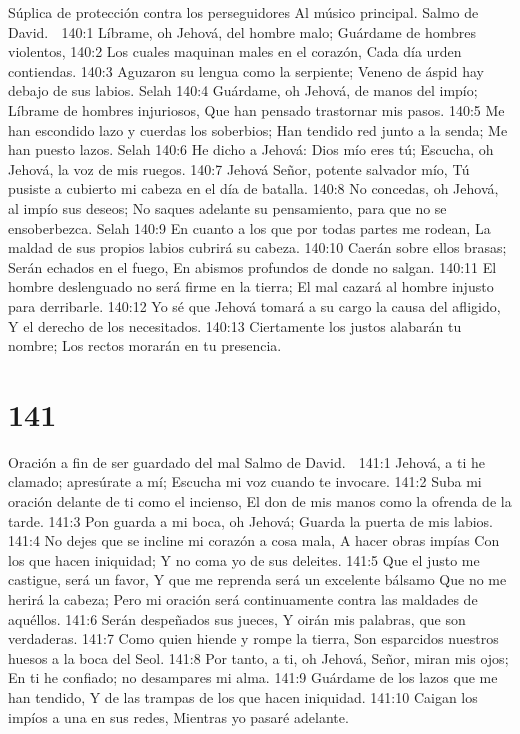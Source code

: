 Súplica de protección contra los perseguidores 
Al músico principal. Salmo de David. 

140:1 Líbrame, oh Jehová, del hombre malo; 
Guárdame de hombres violentos, 
140:2 Los cuales maquinan males en el corazón, 
Cada día urden contiendas. 
140:3 Aguzaron su lengua como la serpiente; 
Veneno de áspid hay debajo de sus labios. Selah 
140:4 Guárdame, oh Jehová, de manos del impío; 
Líbrame de hombres injuriosos, 
Que han pensado trastornar mis pasos. 
140:5 Me han escondido lazo y cuerdas los soberbios; 
Han tendido red junto a la senda; 
Me han puesto lazos. Selah 
140:6 He dicho a Jehová: Dios mío eres tú; 
Escucha, oh Jehová, la voz de mis ruegos. 
140:7 Jehová Señor, potente salvador mío, 
Tú pusiste a cubierto mi cabeza en el día de batalla. 
140:8 No concedas, oh Jehová, al impío sus deseos; 
No saques adelante su pensamiento, para que no se ensoberbezca. Selah 
140:9 En cuanto a los que por todas partes me rodean, 
La maldad de sus propios labios cubrirá su cabeza. 
140:10 Caerán sobre ellos brasas; 
Serán echados en el fuego, 
En abismos profundos de donde no salgan. 
140:11 El hombre deslenguado no será firme en la tierra; 
El mal cazará al hombre injusto para derribarle. 
140:12 Yo sé que Jehová tomará a su cargo la causa del afligido, 
Y el derecho de los necesitados. 
140:13 Ciertamente los justos alabarán tu nombre; 
Los rectos morarán en tu presencia. 

\chapter{141}

Oración a fin de ser guardado del mal 
Salmo de David. 

141:1 Jehová, a ti he clamado; apresúrate a mí; 
Escucha mi voz cuando te invocare. 
141:2 Suba mi oración delante de ti como el incienso, 
El don de mis manos como la ofrenda de la tarde. 
141:3 Pon guarda a mi boca, oh Jehová; 
Guarda la puerta de mis labios. 
141:4 No dejes que se incline mi corazón a cosa mala, 
A hacer obras impías 
Con los que hacen iniquidad; 
Y no coma yo de sus deleites. 
141:5 Que el justo me castigue, será un favor, 
Y que me reprenda será un excelente bálsamo 
Que no me herirá la cabeza; 
Pero mi oración será continuamente contra las maldades de aquéllos. 
141:6 Serán despeñados sus jueces, 
Y oirán mis palabras, que son verdaderas. 
141:7 Como quien hiende y rompe la tierra, 
Son esparcidos nuestros huesos a la boca del Seol. 
141:8 Por tanto, a ti, oh Jehová, Señor, miran mis ojos; 
En ti he confiado; no desampares mi alma. 
141:9 Guárdame de los lazos que me han tendido, 
Y de las trampas de los que hacen iniquidad. 
141:10 Caigan los impíos a una en sus redes, 
Mientras yo pasaré adelante. 

